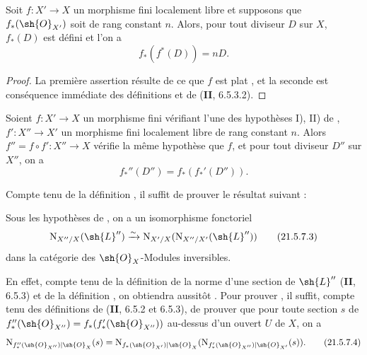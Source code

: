 \begin{proposition}[21.5.6]
\label{IV.21.5.6}
Soit $f:X'\to X$ un morphisme fini localement libre et supposons que $f_*(\sh{O}_{X'})$ soit de rang constant $n$.
Alors, pour tout diviseur $D$ sur $X$, $f_*(D)$ est défini et l'on a
\[
\label{IV.21.5.6.1}
  f_*(f^*(D))=nD.
  \tag{21.5.6.1}
\]
\end{proposition}

\begin{proof}
La première assertion résulte de ce que $f$ est plat , et la seconde est conséquence immédiate des définitions et de (\textbf{II}, 6.5.3.2).
\end{proof}

\begin{proposition}[21.5.7]
\label{IV.21.5.7}
Soient $f:X'\to X$ un morphisme fini vérifiant l'une des hypothèses I), II) de , $f':X''\to X'$ un morphisme fini localement libre de rang constant $n$.
Alors $f''=f\circ f':X''\to X$ vérifie la même hypothèse que $f$, et pour tout diviseur $D''$ sur $X''$, on a
\[
\label{IV.21.5.7.1}
  f_*''(D'')=f_*(f_*'(D'')).
  \tag{21.5.7.1}
\]
\end{proposition}

Compte tenu de la définition , il suffit de prouver le résultat suivant :

\begin{lemma}[21.5.7.2]
\label{IV.21.5.7.2}
Sous les hypothèses de , on a un isomorphisme fonctoriel
\[
\label{IV.21.5.7.3}
  \mathrm{N}_{X''/X}(\sh{L}'')\xrightarrow{\sim}\mathrm{N}_{X'/X}(\mathrm{N}_{X''/X'}(\sh{L}''))
  \tag{21.5.7.3}
\]
dans la catégorie des $\sh{O}_X$-Modules inversibles.
\end{lemma}

En effet, compte tenu de la définition de la norme d'une section de $\sh{L}''$ (\textbf{II}, 6.5.3) et de la définition , on obtiendra aussitôt .
Pour prouver , il suffit, compte tenu des définitions de (\textbf{II}, 6.5.2 et 6.5.3), de prouver que pour toute section $s$ de $f_*''(\sh{O}_{X''})=f_*(f_*'(\sh{O}_{X''}))$ au-dessus d'un ouvert $U$ de $X$, on a
\[
\label{IV.21.5.7.4}
  \mathrm{N}_{f_*''(\sh{O}_{X''})|\sh{O}_X}(s)=\mathrm{N}_{f_*(\sh{O}_{X'})|\sh{O}_X}(\mathrm{N}_{f_*'(\sh{O}_{X''})|\sh{O}_{X'}}(s)).
  \tag{21.5.7.4}
\]


